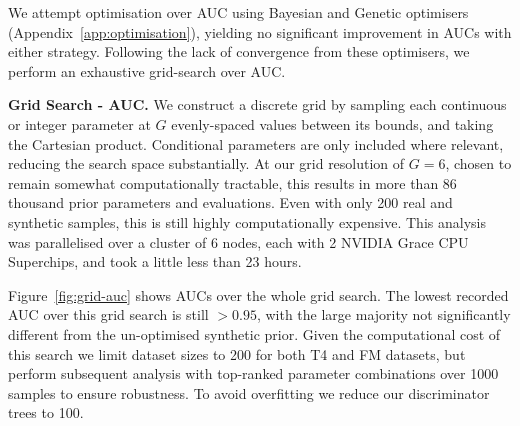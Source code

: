 \documentclass{article}
\begin{document}
We attempt optimisation over AUC using Bayesian and Genetic optimisers (Appendix~\ref{app:optimisation}), yielding no significant improvement in AUCs with either strategy.
Following the lack of convergence from these optimisers, we perform an exhaustive grid-search over AUC.



\textbf{Grid Search - AUC.}
We construct a discrete grid by sampling each continuous or integer parameter at $G$ evenly-spaced values between its bounds, and taking the Cartesian product. Conditional parameters are only included where relevant, reducing the search space substantially. 
At our grid resolution of $G=6$, chosen to remain somewhat computationally tractable, this results in more than 86 thousand prior parameters and evaluations.
Even with only 200 real and synthetic samples, this is still highly computationally expensive.
This analysis was parallelised over a cluster of 6 nodes, each with 2 NVIDIA Grace CPU Superchips, and took a little less than 23 hours.




Figure~\ref{fig:grid-auc} shows AUCs over the whole grid search.
The lowest recorded AUC over this grid search is still $>0.95$, with the large majority not significantly different from the un-optimised synthetic prior.
Given the computational cost of this search we limit dataset sizes to 200 for both T4 and FM datasets, but perform subsequent analysis with top-ranked parameter combinations over 1000 samples to ensure robustness.
To avoid overfitting we reduce our discriminator trees to 100.
\end{document}
